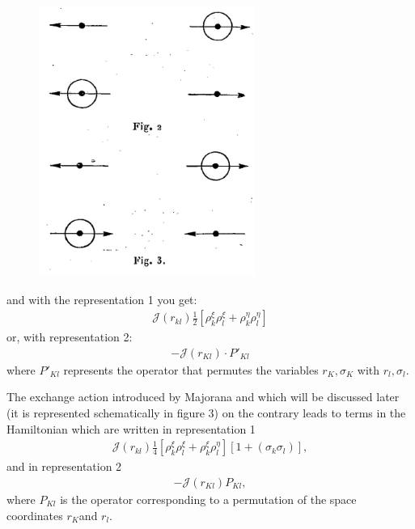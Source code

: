 \documentclass[a4paper,11pt]{article}
\newcommand{\?}[2]{#1\footnote{\textsc{Translator note}: #2}}
\newcommand{\nequ}[2]{\begin{align*}\tag{#1}#2\end{align*}}
\begin{document}
{{\begin{figure}[h!]
\centering
\includegraphics[width=200pt]{images/Fig2Fig3}
\end{figure}

and with the representation 1 you get:
\nequ{10}{
\mathcal{J}(r_{kl})\frac{1}{2}\left[\rho_k^\xi \rho_l^\xi + 
\rho_k^\eta \rho_l^\eta \right]
}
or, with representation 2:
\nequ{11}{
-\mathcal{J}(r_{Kl})\cdot P'_{Kl}
}
where $P'_{Kl}$ 
represents the operator that permutes the variables $r_K,\sigma_K$ with $r_l,\sigma_l$.

The exchange action introduced by Majorana and which will be discussed later (it is represented schematically in figure 3) on the contrary leads to terms in the Hamiltonian which are written in representation 1
\nequ{12}{
\mathcal{J}(r_{kl})\frac{1}{4} \left[\rho_k^\xi \rho_l^\xi + 
\rho_k^\xi  \rho_l^\eta \right]\left[1+(\sigma_k\sigma_l)\right],
}
and in representation 2
\nequ{13}{
-\mathcal{J}(r_{Kl})P_{Kl},
}
where $P_{Kl}$ is the operator corresponding to a permutation of the space coordinates $r_K$and $r_l$.

}}
\end{document}
